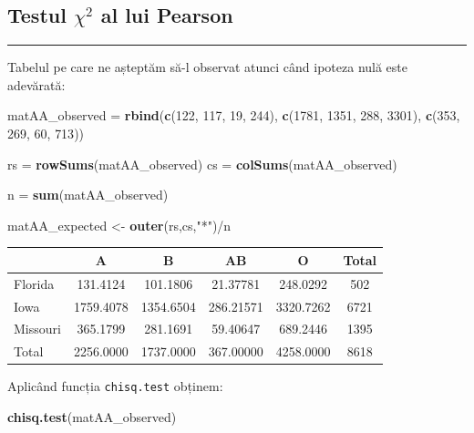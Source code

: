 \documentclass[]{article}
\newenvironment{Shaded}{\begin{snugshade}}{\end{snugshade}}
\newcommand{\KeywordTok}[1]{\textcolor[rgb]{0.13,0.29,0.53}{\textbf{{#1}}}}
\newcommand{\DecValTok}[1]{\textcolor[rgb]{0.00,0.00,0.81}{{#1}}}
\newcommand{\StringTok}[1]{\textcolor[rgb]{0.31,0.60,0.02}{{#1}}}
\newcommand{\NormalTok}[1]{{#1}}
\begin{document}
\subsection{\texorpdfstring{Testul \(\chi^2\) al lui
Pearson}{Testul \textbackslash{}chi\^{}2 al lui Pearson}}\label{testul-chi2-al-lui-pearson}

\begin{center}\rule{0.5\linewidth}{\linethickness}\end{center}

Tabelul pe care ne așteptăm să-l observat atunci când ipoteza nulă este
adevărată:

\begin{Shaded}
\begin{Highlighting}[]
  \NormalTok{matAA_observed =}\StringTok{ }\KeywordTok{rbind}\NormalTok{(}\KeywordTok{c}\NormalTok{(}\DecValTok{122}\NormalTok{, }\DecValTok{117}\NormalTok{, }\DecValTok{19}\NormalTok{, }\DecValTok{244}\NormalTok{),}
           \KeywordTok{c}\NormalTok{(}\DecValTok{1781}\NormalTok{, }\DecValTok{1351}\NormalTok{, }\DecValTok{288}\NormalTok{, }\DecValTok{3301}\NormalTok{),}
           \KeywordTok{c}\NormalTok{(}\DecValTok{353}\NormalTok{, }\DecValTok{269}\NormalTok{, }\DecValTok{60}\NormalTok{, }\DecValTok{713}\NormalTok{))}

  \NormalTok{rs =}\StringTok{ }\KeywordTok{rowSums}\NormalTok{(matAA_observed) }
  \NormalTok{cs =}\StringTok{ }\KeywordTok{colSums}\NormalTok{(matAA_observed) }
  
  \NormalTok{n =}\StringTok{ }\KeywordTok{sum}\NormalTok{(matAA_observed)}
  
  \NormalTok{matAA_expected <-}\StringTok{ }\KeywordTok{outer}\NormalTok{(rs,cs,}\StringTok{"*"}\NormalTok{)/n}
\end{Highlighting}
\end{Shaded}

\begin{longtable}[]{@{}lccccc@{}}
\toprule
& A & B & AB & O & Total\tabularnewline
\midrule
\endhead
Florida & 131.4124 & 101.1806 & 21.37781 & 248.0292 & 502\tabularnewline
Iowa & 1759.4078 & 1354.6504 & 286.21571 & 3320.7262 &
6721\tabularnewline
Missouri & 365.1799 & 281.1691 & 59.40647 & 689.2446 &
1395\tabularnewline
Total & 2256.0000 & 1737.0000 & 367.00000 & 4258.0000 &
8618\tabularnewline
\bottomrule
\end{longtable}

Aplicând funcția \texttt{chisq.test} obținem:

\begin{Shaded}
\begin{Highlighting}[]
\KeywordTok{chisq.test}\NormalTok{(matAA_observed)}
\end{Highlighting}
\end{Shaded}
\end{document}

